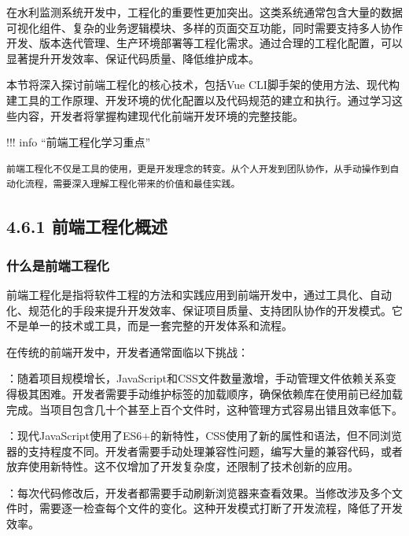 在水利监测系统开发中，工程化的重要性更加突出。这类系统通常包含大量的数据可视化组件、复杂的业务逻辑模块、多样的页面交互功能，同时需要支持多人协作开发、版本迭代管理、生产环境部署等工程化需求。通过合理的工程化配置，可以显著提升开发效率、保证代码质量、降低维护成本。

本节将深入探讨前端工程化的核心技术，包括Vue CLI脚手架的使用方法、现代构建工具的工作原理、开发环境的优化配置以及代码规范的建立和执行。通过学习这些内容，开发者将掌握构建现代化前端开发环境的完整技能。

!!! info ``前端工程化学习重点''

\begin{verbatim}
前端工程化不仅是工具的使用，更是开发理念的转变。从个人开发到团队协作，从手动操作到自动化流程，需要深入理解工程化带来的价值和最佳实践。
\end{verbatim}

\hypertarget{ux524dux7aefux5de5ux7a0bux5316ux6982ux8ff0}{%
\subsection{4.6.1 前端工程化概述}\label{ux524dux7aefux5de5ux7a0bux5316ux6982ux8ff0}}

\hypertarget{ux4ec0ux4e48ux662fux524dux7aefux5de5ux7a0bux5316}{%
\subsubsection{什么是前端工程化}\label{ux4ec0ux4e48ux662fux524dux7aefux5de5ux7a0bux5316}}

前端工程化是指将软件工程的方法和实践应用到前端开发中，通过工具化、自动化、规范化的手段来提升开发效率、保证项目质量、支持团队协作的开发模式。它不是单一的技术或工具，而是一套完整的开发体系和流程。

在传统的前端开发中，开发者通常面临以下挑战：

：随着项目规模增长，JavaScript和CSS文件数量激增，手动管理文件依赖关系变得极其困难。开发者需要手动维护标签的加载顺序，确保依赖库在使用前已经加载完成。当项目包含几十个甚至上百个文件时，这种管理方式容易出错且效率低下。

：现代JavaScript使用了ES6+的新特性，CSS使用了新的属性和语法，但不同浏览器的支持程度不同。开发者需要手动处理兼容性问题，编写大量的兼容代码，或者放弃使用新特性。这不仅增加了开发复杂度，还限制了技术创新的应用。

：每次代码修改后，开发者都需要手动刷新浏览器来查看效果。当修改涉及多个文件时，需要逐一检查每个文件的变化。这种开发模式打断了开发流程，降低了开发效率。

